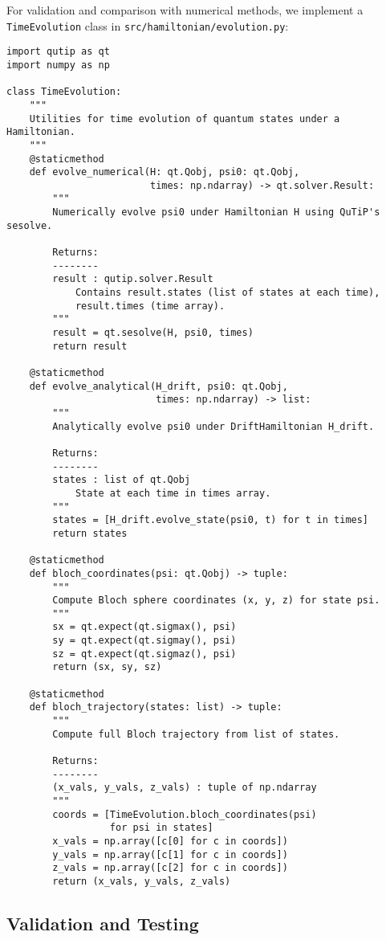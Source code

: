 \documentclass[11pt,a4paper]{article}
\theoremstyle{definition}
\theoremstyle{remark}
\begin{document}
For validation and comparison with numerical methods, we implement a \texttt{TimeEvolution} class in \texttt{src/hamiltonian/evolution.py}:

\begin{lstlisting}[caption={Time evolution engine}]
import qutip as qt
import numpy as np

class TimeEvolution:
    """
    Utilities for time evolution of quantum states under a Hamiltonian.
    """
    @staticmethod
    def evolve_numerical(H: qt.Qobj, psi0: qt.Qobj,
                         times: np.ndarray) -> qt.solver.Result:
        """
        Numerically evolve psi0 under Hamiltonian H using QuTiP's sesolve.

        Returns:
        --------
        result : qutip.solver.Result
            Contains result.states (list of states at each time),
            result.times (time array).
        """
        result = qt.sesolve(H, psi0, times)
        return result

    @staticmethod
    def evolve_analytical(H_drift, psi0: qt.Qobj,
                          times: np.ndarray) -> list:
        """
        Analytically evolve psi0 under DriftHamiltonian H_drift.

        Returns:
        --------
        states : list of qt.Qobj
            State at each time in times array.
        """
        states = [H_drift.evolve_state(psi0, t) for t in times]
        return states

    @staticmethod
    def bloch_coordinates(psi: qt.Qobj) -> tuple:
        """
        Compute Bloch sphere coordinates (x, y, z) for state psi.
        """
        sx = qt.expect(qt.sigmax(), psi)
        sy = qt.expect(qt.sigmay(), psi)
        sz = qt.expect(qt.sigmaz(), psi)
        return (sx, sy, sz)

    @staticmethod
    def bloch_trajectory(states: list) -> tuple:
        """
        Compute full Bloch trajectory from list of states.

        Returns:
        --------
        (x_vals, y_vals, z_vals) : tuple of np.ndarray
        """
        coords = [TimeEvolution.bloch_coordinates(psi)
                  for psi in states]
        x_vals = np.array([c[0] for c in coords])
        y_vals = np.array([c[1] for c in coords])
        z_vals = np.array([c[2] for c in coords])
        return (x_vals, y_vals, z_vals)
\end{lstlisting}

\subsection{Validation and Testing}
\end{document}
